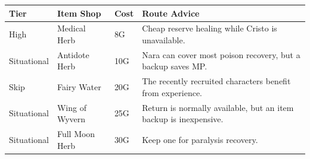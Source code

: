 \documentclass[
  american,
  10pt,
  letterpaper,
  oneside,
  open=any]{scrreprt}
\newcounter{none} %
\newenvironment{guidetable}{%
  \small\setstretch{1.0}%
  \setlength{\tabcolsep}{4pt}%
  \setlength{\LTpre}{8pt}\setlength{\LTpost}{10pt}%
  \renewcommand{\arraystretch}{1.16}%
}{ }
\begin{document}
\begin{guidetable}

{\def\LTcaptype{none} %
\begin{longtable}[]{@{}
  >{\raggedright\arraybackslash}p{}
  >{\raggedright\arraybackslash}p{}
  >{\raggedleft\arraybackslash}p{}
  >{\raggedright\arraybackslash}p{}@{}}
\toprule\noalign{}
\begin{minipage}[b]{\linewidth}\raggedright
\color{GuideGreen}\bfseries Tier
\end{minipage} & \begin{minipage}[b]{\linewidth}\raggedright
\color{GuideGreen}\bfseries Item Shop
\end{minipage} & \begin{minipage}[b]{\linewidth}\raggedleft
\color{GuideGreen}\bfseries Cost
\end{minipage} & \begin{minipage}[b]{\linewidth}\raggedright
\color{GuideGreen}\bfseries Route Advice
\end{minipage} \\
\midrule\noalign{}
\endhead
\bottomrule\noalign{}
\endlastfoot
High & Medical Herb & 8G & Cheap reserve healing while Cristo is
unavailable. \\
Situational & Antidote Herb & 10G & Nara can cover most poison recovery,
but a backup saves MP. \\
Skip & Fairy Water & 20G & The recently recruited characters benefit
from experience. \\
Situational & Wing of Wyvern & 25G & Return is normally available, but
an item backup is inexpensive. \\
Situational & Full Moon Herb & 30G & Keep one for paralysis recovery. \\
\end{longtable}
}

\end{guidetable}
\end{document}
